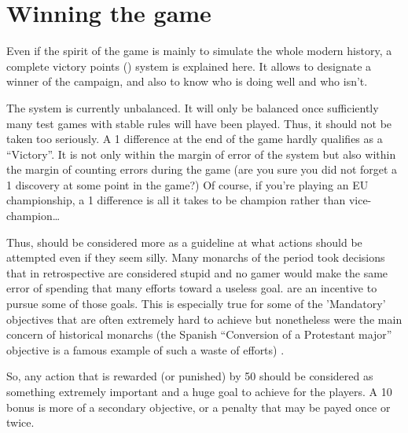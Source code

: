 
\chapter{Winning the game}\label{chapter:Victories}



\begin{designnote}
  Even if the spirit of the game is mainly to simulate the whole modern
  history, a complete victory points (\VPs) system is explained here. It
  allows to designate a winner of the campaign, and also to know who is
  doing well and who isn't.

  The \VPs system is currently unbalanced. It will only be balanced once
  sufficiently many test games with stable rules will have been played. Thus,
  it should not be taken too seriously. A 1 \VP difference at the end of the
  game hardly qualifies as a ``Victory''. It is not only within the margin of
  error of the system but also within the margin of counting errors during the
  game (are you sure you did not forget a 1 \VP discovery at some point in the
  game?) Of course, if you're playing an EU championship, a 1 \VP difference
  is all it takes to be champion rather than vice-champion\ldots

  Thus, \VPs should be considered more as a guideline at what actions
  should be attempted even if they seem silly. Many monarchs of the
  period took decisions that in retrospective are considered stupid and
  no gamer would make the same error of spending that many efforts
  toward a useless goal. \VPs are an incentive to pursue some of those
  goals. This is especially true for some of the 'Mandatory' objectives
  that are often extremely hard to achieve but nonetheless were the main
  concern of historical monarchs (the Spanish ``Conversion of a
  Protestant major'' objective is a famous example of such a waste of
  efforts) .

  So, any action that is rewarded (or punished) by 50 \VPs should be
  considered as something extremely important and a huge goal to achieve for
  the players. A 10 \VPs bonus is more of a secondary objective, or a penalty
  that may be payed once or twice.
\end{designnote}


